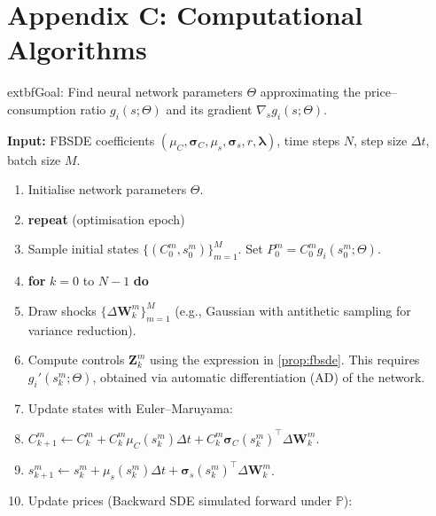 ﻿\documentclass[11pt,letterpaper,oneside]{article}
\numberwithin{equation}{section}
\newcommand{\1}{\mathbf{1}}
\begin{document}
\section{Appendix C: Computational Algorithms}\label{app:algorithms}

\begin{tcolorbox}[float, title={Algorithm 1: Deep BSDE Training Loop (Infinite-Horizon Adaptation)}, label={alg:deepbsde}]
\small
  extbf{Goal:} Find neural network parameters $\Theta$ approximating the price--consumption ratio $g_i(s;\Theta)$ and its gradient $\nabla_s g_i(s;\Theta)$.

\textbf{Input:} FBSDE coefficients $(\mu_C,\bm{\sigma}_C,\mu_s,\bm{\sigma}_s,r,\bm{\lambda})$, time steps $N$, step size $\Delta t$, batch size $M$.

\begin{enumerate}[leftmargin=1.5em,itemsep=0.5em]

  \item Initialise network parameters $\Theta$.

  \item \textbf{repeat} (optimisation epoch)

  \item \quad Sample initial states $\{(C_0^m,s_0^m)\}_{m=1}^M$. Set $P_0^m = C_0^m g_i(s_0^m;\Theta)$.

  \item \quad \textbf{for} $k=0$ to $N-1$ \textbf{do}

    \item \quad\quad Draw shocks $\{\Delta\bm{W}_k^m\}_{m=1}^M$ (e.g., Gaussian with antithetic sampling for variance reduction).

  \item \quad\quad Compute controls $\bm{Z}_k^m$ using the expression in \cref{prop:fbsde}. This requires $g_i'(s_k^m;\Theta)$, obtained via automatic differentiation (AD) of the network.

    \item \quad\quad Update states with Euler--Maruyama:

      \item \quad\quad\quad $C_{k+1}^m \leftarrow C_k^m + C_k^m \mu_C(s_k^m)\Delta t + C_k^m \bm{\sigma}_C(s_k^m)^{\top}\Delta\bm{W}_k^m$.

      \item \quad\quad\quad $s_{k+1}^m \leftarrow s_k^m + \mu_s(s_k^m)\Delta t + \bm{\sigma}_s(s_k^m)^{\top}\Delta\bm{W}_k^m$.

      \item \quad\quad Update prices (Backward SDE simulated forward under $\mathbb{P}$):


\end{enumerate}
\end{tcolorbox}
\end{document}

